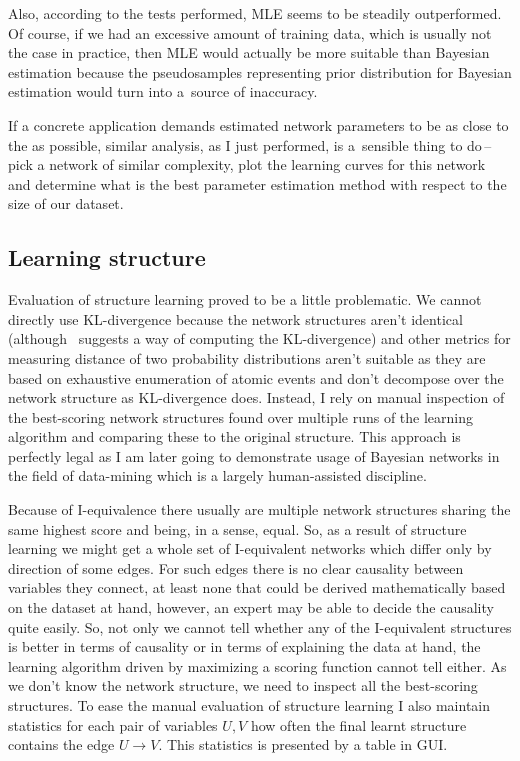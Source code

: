 \documentclass[english,cover]{fitthesis} %
\begin{document}
Also, according to the tests performed, MLE seems to be steadily outperformed. Of course, if we had an excessive amount of training data, which is usually not the case in practice, then MLE would actually be more suitable than Bayesian estimation because the pseudosamples representing prior distribution for Bayesian estimation would turn into a~source of inaccuracy.

If a concrete application demands estimated network parameters to be as close to the  as possible, similar analysis, as I just performed, is a~sensible thing to do\,--\,pick a network of similar complexity, plot the learning curves for this network and determine what is the best parameter estimation method with respect to the size of our dataset.



\subsection{Learning structure}
Evaluation of structure learning proved to be a little problematic. We cannot directly use KL-divergence because the network structures aren't identical (although~\cite{heckerman95_learning} suggests a way of computing the KL-divergence) and other metrics for measuring distance of two probability distributions aren't suitable as they are based on exhaustive enumeration of atomic events and don't decompose over the network structure as KL-divergence does. Instead, I rely on manual inspection of the best-scoring network structures found over multiple runs of the learning algorithm and comparing these to the original structure. This approach is perfectly legal as I am later going to demonstrate usage of Bayesian networks in the field of data-mining which is a largely human-assisted discipline.

Because of I-equivalence there usually are multiple network structures sharing the same highest score and being, in a sense, equal. So, as a result of structure learning we might get a whole set of I-equivalent networks which differ only by direction of some edges. For such edges there is no clear causality between variables they connect, at least none that could be derived mathematically based on the dataset at hand, however, an expert may be able to decide the causality quite easily. So, not only we cannot tell whether any of the I-equivalent structures is better in terms of causality or in terms of explaining the data at hand, the learning algorithm driven by maximizing a scoring function cannot tell either. As we don't know the  network structure, we need to inspect all the best-scoring structures. To ease the manual evaluation of structure learning I also maintain statistics for each pair of variables $U, V$ how often the final learnt structure contains the edge $U \rightarrow V$. This statistics is presented by a table in GUI.
\end{document}
